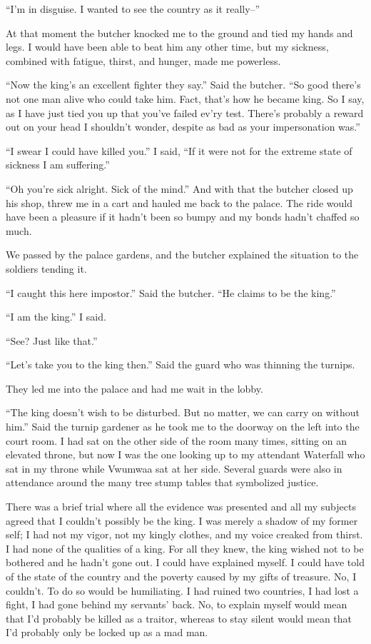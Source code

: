 ``I'm in disguise. I wanted to see the country as it really--''

At that moment the butcher knocked me to the ground and tied my hands and legs. I would have been able to beat him any other time, but my sickness, combined with fatigue, thirst, and hunger, made me powerless.

``Now the king's an excellent fighter they say.'' Said the butcher. ``So good there's not one man alive who could take him. Fact, that's how he became king. So I say, as I have just tied you up that you've failed ev'ry test. There's probably a reward out on your head I shouldn't wonder, despite as bad as your impersonation was.''

``I swear I could have killed you.'' I said, ``If it were not for the extreme state of sickness I am suffering.''

``Oh you're sick alright. Sick of the mind.'' And with that the butcher closed up his shop, threw me in a cart and hauled me back to the palace. The ride would have been a pleasure if it hadn't been so bumpy and my bonds hadn't chaffed so much.

We passed by the palace gardens, and the butcher explained the situation to the soldiers tending it.

``I caught this here impostor.'' Said the butcher. ``He claims to be the king.''

``I am the king.'' I said.

``See? Just like that.''

``Let's take you to the king then.'' Said the guard who was thinning the turnips.

They led me into the palace and had me wait in the lobby.

``The king doesn't wish to be disturbed. But no matter, we can carry on without him.'' Said the turnip gardener as he took me to the doorway on the left into the court room. I had sat on the other side of the room many times, sitting on an elevated throne, but now I was the one looking up to my attendant Waterfall who sat in my throne while Vwumwaa sat at her side. Several guards were also in attendance around the many tree stump tables that symbolized justice.

\tbreak

There was a brief trial where all the evidence was presented and all my subjects agreed that I couldn't possibly be the king. I was merely a shadow of my former self; I had not my vigor, not my kingly clothes, and my voice creaked from thirst. I had none of the qualities of a king. For all they knew, the king wished not to be bothered and he hadn't gone out. I could have explained myself. I could have told of the state of the country and the poverty caused by my gifts of treasure. No, I couldn't. To do so would be humiliating. I had ruined two countries, I had lost a fight, I had gone behind my servants' back. No, to explain myself would mean that I'd probably be killed as a traitor, whereas to stay silent would mean that I'd probably only be locked up as a mad man.


